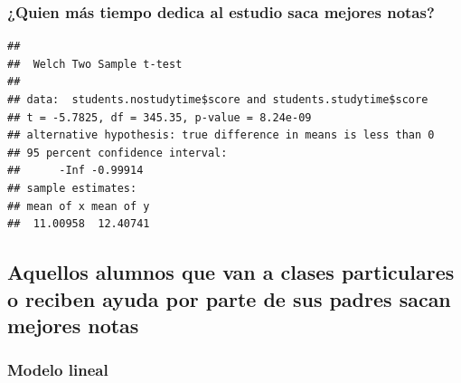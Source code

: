 \documentclass[]{article}
\newenvironment{Shaded}{\begin{snugshade}}{\end{snugshade}}
\newcommand{\DataTypeTok}[1]{\textcolor[rgb]{0.87,0.87,0.75}{#1}}
\newcommand{\KeywordTok}[1]{\textcolor[rgb]{0.94,0.87,0.69}{#1}}
\newcommand{\NormalTok}[1]{\textcolor[rgb]{0.80,0.80,0.80}{#1}}
\newcommand{\OperatorTok}[1]{\textcolor[rgb]{0.94,0.94,0.82}{#1}}
\newcommand{\StringTok}[1]{\textcolor[rgb]{0.80,0.58,0.58}{#1}}
\begin{document}
\hypertarget{quien-mas-tiempo-dedica-al-estudio-saca-mejores-notas}{%
\subsubsection{¿Quien más tiempo dedica al estudio saca mejores
notas?}\label{quien-mas-tiempo-dedica-al-estudio-saca-mejores-notas}}

\begin{Shaded}
\end{Shaded}

\begin{verbatim}
## 
##  Welch Two Sample t-test
## 
## data:  students.nostudytime$score and students.studytime$score
## t = -5.7825, df = 345.35, p-value = 8.24e-09
## alternative hypothesis: true difference in means is less than 0
## 95 percent confidence interval:
##      -Inf -0.99914
## sample estimates:
## mean of x mean of y 
##  11.00958  12.40741
\end{verbatim}

\hypertarget{aquellos-alumnos-que-van-a-clases-particulares-o-reciben-ayuda-por-parte-de-sus-padres-sacan-mejores-notas}{%
\subsection{Aquellos alumnos que van a clases particulares o reciben
ayuda por parte de sus padres sacan mejores
notas}\label{aquellos-alumnos-que-van-a-clases-particulares-o-reciben-ayuda-por-parte-de-sus-padres-sacan-mejores-notas}}

\hypertarget{modelo-lineal}{%
\subsubsection{Modelo lineal}\label{modelo-lineal}}
\end{document}
